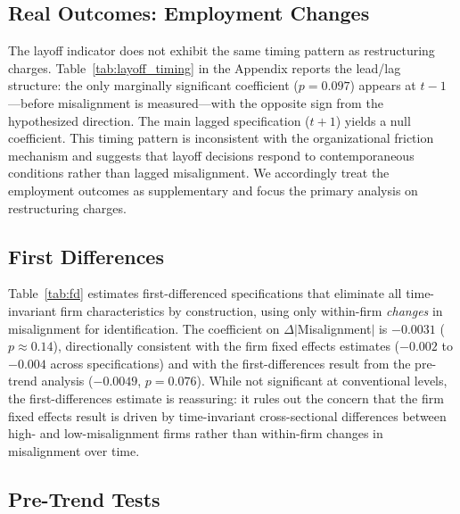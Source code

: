\subsection{Real Outcomes: Employment Changes}

The layoff indicator does not exhibit the same timing pattern as
restructuring charges. Table~\ref{tab:layoff_timing} in the Appendix
reports the lead/lag structure: the only marginally significant
coefficient ($p = 0.097$) appears at $t-1$---before misalignment is
measured---with the opposite sign from the hypothesized direction.
The main lagged specification ($t+1$) yields a null coefficient.
This timing pattern is inconsistent with the organizational friction
mechanism and suggests that layoff decisions respond to contemporaneous
conditions rather than lagged misalignment. We accordingly treat the
employment outcomes as supplementary and focus the primary analysis
on restructuring charges.

\subsection{First Differences}

Table~\ref{tab:fd} estimates first-differenced specifications that
eliminate all time-invariant firm characteristics by construction,
using only within-firm \textit{changes} in misalignment for
identification. The coefficient on $\Delta|$Misalignment$|$ is
$-0.0031$ ($p \approx 0.14$), directionally consistent with the
firm fixed effects estimates ($-0.002$ to $-0.004$ across
specifications) and with the first-differences result from the
pre-trend analysis ($-0.0049$, $p = 0.076$). While not significant
at conventional levels, the first-differences estimate is reassuring:
it rules out the concern that the firm fixed effects result is driven
by time-invariant cross-sectional differences between high- and
low-misalignment firms rather than within-firm changes in
misalignment over time.

\subsection{Pre-Trend Tests}

